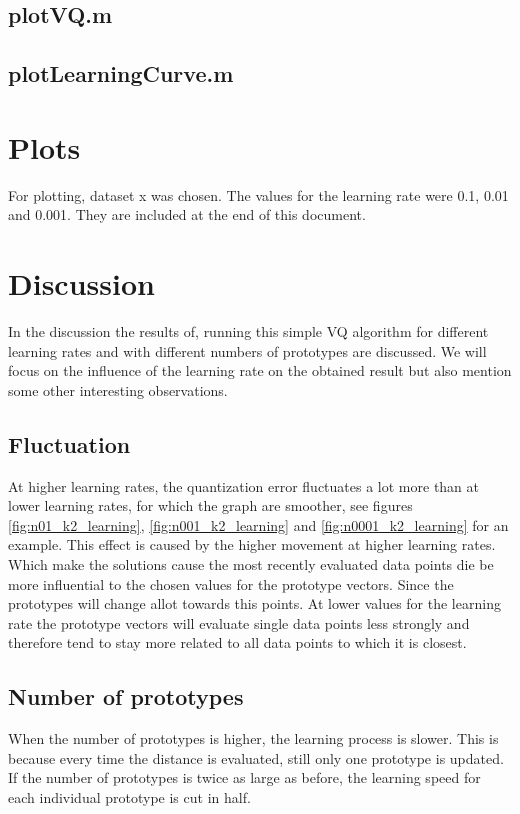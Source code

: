 \documentclass[10pt,a4paper]{article}
\begin{document}
\subsection{plotVQ.m}


\subsection{plotLearningCurve.m}


\section{Plots}
For plotting, dataset x was chosen. The values for the learning rate were 0.1, 0.01 and 0.001. They are included at the end of this document.

\section{Discussion}
In the discussion the results of, running this simple VQ algorithm for different learning rates and with different numbers of prototypes are discussed. We will focus on the influence of the learning rate on the obtained result but also mention some other interesting observations.

\subsection{Fluctuation}
\label{subsec:fluc}
At higher learning rates, the quantization error fluctuates a lot more than at lower learning rates, for which the graph are smoother, see figures \ref{fig:n01_k2_learning}, \ref{fig:n001_k2_learning} and \ref{fig:n0001_k2_learning} for an example. This effect is caused by the higher movement at higher learning rates. Which make the solutions cause the most recently evaluated data points die be more influential to the chosen values for the prototype vectors. Since the prototypes will change allot towards this points. At lower values for the learning rate the prototype vectors will evaluate single data points less strongly and therefore tend to stay more related to all data points to which it is closest.

\subsection{Number of prototypes}
\label{subsec:numpro}
When the number of prototypes is higher, the learning process is slower. This is because every time the distance is evaluated, still only one prototype is updated. If the number of prototypes is twice as large as before, the learning speed for each individual prototype is cut in half.
\end{document}
